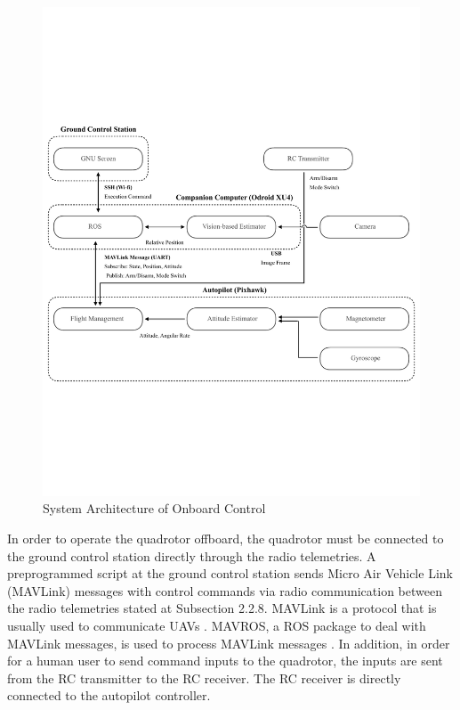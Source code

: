 \begin{figure}
    \centering
    \includegraphics[width=1.0\textwidth]{graphics/architecture_02.pdf}
    \caption{System Architecture of Onboard Control}
    \label{fig:overview_02}
\end{figure}

In order to operate the quadrotor offboard, the quadrotor must be connected to the ground control station directly through the radio telemetries. A preprogrammed script at the ground control station sends Micro Air Vehicle Link (MAVLink) messages with control commands via radio communication between the radio telemetries stated at Subsection 2.2.8. MAVLink is a protocol that is usually used to communicate UAVs \cite{qgroundcontrol}. MAVROS, a ROS package to deal with MAVLink messages, is used to process MAVLink messages \cite{mavros}. In addition, in order for a human user to send command inputs to the quadrotor, the inputs are sent from the RC transmitter to the RC receiver. The RC receiver is directly connected to the autopilot controller.

